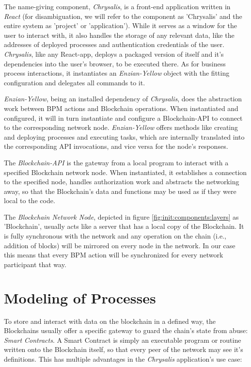 The name-giving component, \emph{Chrysalis}, is a front-end application written in \emph{React} (for disambiguation, we will refer to the component as 'Chrysalis' and the entire system as 'project' or 'application'). While it serves as a window for the user to interact with, it also handles the storage of any relevant data, like the addresses of deployed processes and authentication credentials of the user. \emph{Chrysalis}, like any React-app, deploys a packaged version of itself and it's dependencies into the user's browser, to be executed there. As for business process interactions, it instantiates an \emph{Enzian-Yellow} object with the fitting configuration and delegates all commands to it.

\emph{Enzian-Yellow}, being an installed dependency of \emph{Chrysalis}, does the abstraction work between BPM actions and Blockchain operations. When instantiated and configured, it will in turn instantiate and configure a Blockchain-API to connect to the corresponding network node. \emph{Enzian-Yellow} offers methods like creating and deploying processes and executing tasks, which are internally translated into the corresponding API invocations, and vice versa for the node's responses.

The \emph{Blockchain-API} is the gateway from a local program to interact with a specified Blockchain network node. When instantiated, it establishes a connection to the specified node, handles authorization work and abstracts the networking away, so that the Blockchain's data and functions may be used as if they were local to the code.

The \emph{Blockchain Network Node}, depicted in figure \ref{fig:init:components:layers} as 'Blockchain', usually acts like a server that has a local copy of the Blockchain. It is fully synchronous with the network and any operation on the chain (i.e., addition of blocks) will be mirrored on every node in the network. In our case this means that every BPM action will be synchronized for every network participant that way.

\section{Modeling of Processes}
\label{sec:init:model}

To store and interact with data on the blockchain in a defined way, the Blockchains usually offer a specific gateway to guard the chain's state from abuse: \emph{Smart Contracts}. A Smart Contract is simply an executable program or routine written onto the Blockchain itself, so that every peer of the network may see it's definitions. This has multiple advantages in the \emph{Chrysalis} application's use case:

